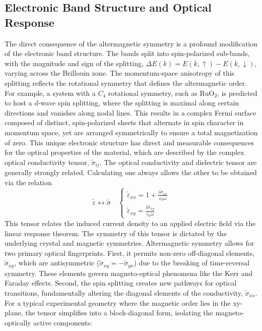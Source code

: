 \documentclass{article}
\begin{document}
\subsection{Electronic Band Structure and Optical Response}
The direct consequence of the altermagnetic symmetry is a profound modification of the electronic band structure. The bands split into spin-polarized sub-bands, with the magnitude and sign of the splitting, 
$\Delta E(k)=E(k,\uparrow)-E(k,\downarrow)$, varying across the Brillouin zone. The momentum-space anisotropy of this splitting reflects the rotational symmetry that defines the altermagnetic order. For example, a system with a $C_4$ rotational symmetry, such as \(\mathrm{RuO}_2\), is predicted to host a d-wave spin splitting, where the splitting is maximal along certain directions and vanishes along nodal lines. This results in a complex Fermi surface composed of distinct, spin-polarized sheets that alternate in spin character in momentum space, yet are arranged symmetrically to ensure a total magnetization of zero.
This unique electronic structure has direct and measurable consequences for the optical properties of the material, which are described by the complex optical conductivity tensor, 
$\tilde{\sigma}_{ij}$. The optical conductivity and dielectric tensor are generally strongly related. Calculating one always allows the other to be obtained via the relation
\begin{equation}
\tilde{\varepsilon} \leftrightarrow \tilde{\sigma} \quad \begin{cases} \tilde{\varepsilon}_{xx} = 1 + \frac{i \tilde{\sigma}_{xx}}{\varepsilon_0 \omega}  \\ \tilde{\varepsilon}_{xy} = \frac{i \tilde{\sigma}_{xy}}{\varepsilon_0 \omega}
\end{cases}
\end{equation}
This tensor relates the induced current density to an applied electric field via the linear response theorem. The symmetry of this tensor is dictated by the underlying crystal and magnetic symmetries. Altermagnetic symmetry allows for two primary optical fingerprints. First, it permits non-zero off-diagonal elements, 
$\tilde{\sigma}_{xy}$, which are antisymmetric 
($\tilde{\sigma}_{xy} = -\tilde{\sigma}_{yx}$) due to the breaking of time-reversal symmetry. These elements govern magneto-optical phenomena like the Kerr and Faraday effects. Second, the spin splitting creates new pathways for optical transitions, fundamentally altering the diagonal elements of the conductivity, 
$\tilde{\sigma}_{xx}$.
For a typical experimental geometry where the magnetic order lies in the xy-plane, the tensor simplifies into a block-diagonal form, isolating the magneto-optically active components:
\end{document}
